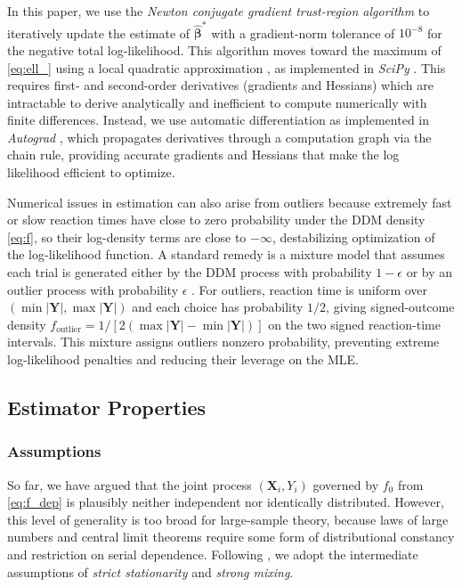 \documentclass[00-main.tex]{subfiles}
\begin{document}
In this paper, we use the \emph{Newton conjugate gradient trust-region algorithm} to iteratively update the estimate of $\hat{\bm\beta}^*$ with a gradient-norm tolerance of $10^{-8}$ for the negative total log-likelihood. This algorithm moves toward the maximum of \eqref{eq:ell_} using a local quadratic approximation \citep{steihaug_conjugate_1983}, as implemented in \emph{SciPy} \citep{virtanen_scipy_2020}. This requires first- and second-order derivatives (gradients and Hessians) which are intractable to derive analytically and inefficient to compute numerically with finite differences. Instead, we use automatic differentiation as implemented in \emph{Autograd} \citep{maclaurin_autograd_2015}, which propagates derivatives through a computation graph via the chain rule, providing accurate gradients and Hessians that make the log likelihood efficient to optimize.

Numerical issues in estimation can also arise from outliers because extremely fast or slow reaction times have close to zero probability under the DDM density \eqref{eq:f}, so their log-density terms are close to $-\infty$, destabilizing optimization of the log-likelihood function. A standard remedy is a mixture model that assumes each trial is generated either by the DDM process with probability $1-\epsilon$ or by an outlier process with probability $\epsilon$ \citep{ratcliff_estimating_2002}. For outliers, reaction time is uniform over $(\min|\bm{Y}|, \max|\bm{Y}|)$ and each choice has probability $1/2$, giving signed-outcome density $f_\text{outlier} = 1/[2(\max|\bm{Y}|-\min|\bm{Y}|)]$ on the two signed reaction-time intervals. This mixture assigns outliers nonzero probability, preventing extreme log-likelihood penalties and reducing their leverage on the MLE.

\subsection{Estimator Properties}\label{sec:properties}
\subsubsection{Assumptions}\label{sec:assumptions}
So far, we have argued that the joint process $(\bm{X}_i, Y_i)$ governed by $f_0$ from \eqref{eq:f_dep} is plausibly neither independent nor identically distributed. However, this level of generality is too broad for large-sample theory, because laws of large numbers and central limit theorems require some form of distributional constancy and restriction on serial dependence. Following \citet{hansen_probability_2022,hansen_econometrics_2022}, we adopt the intermediate assumptions of \emph{strict stationarity} and \emph{strong mixing}.
\end{document}
